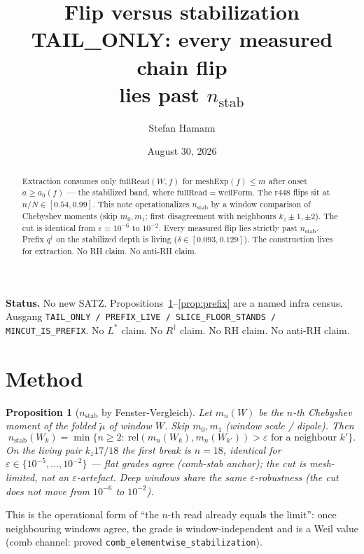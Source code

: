 \documentclass[11pt]{article}
\title{\bfseries Flip versus stabilization\\[2mm]
\large TAIL\_ONLY: every measured chain flip\\
lies past $n_{\mathrm{stab}}$}
\author{Stefan Hamann}
\date{August 30, 2026}
\newtheorem{prop}{Proposition}
\begin{document}
\maketitle

\begin{abstract}\noindent
Extraction consumes only
$\mathrm{fullRead}(W,f)$ for
$\mathrm{meshExp}(f)\le m$ after onset
$a\ge a_0(f)$ --- the stabilized band, where
$\mathrm{fullRead}=\mathrm{weilForm}$.
The r448 flips sit at $n/N\in[0.54,0.99]$.
This note operationalizes $n_{\mathrm{stab}}$
by a window comparison of Chebyshev moments
(skip $m_0,m_1$; first disagreement with
neighbours $k_z{\pm}1,{\pm}2$).
The cut is identical from $\varepsilon=10^{-6}$
to $10^{-2}$.
Every measured flip lies strictly past
$n_{\mathrm{stab}}$.
Prefix $q^{\dagger}$ on the stabilized depth
is living ($\delta\in[0.093,0.129]$).
The construction lives for extraction.
No RH claim.  No anti-RH claim.
\end{abstract}

\medskip\noindent
\textbf{Status.}\enspace
No new SATZ.
Propositions~\ref{prop:method}--\ref{prop:prefix}
are a named infra census.
Ausgang
\texttt{TAIL\_ONLY / PREFIX\_LIVE / SLICE\_FLOOR\_STANDS / MINCUT\_IS\_PREFIX}.
No $L^{*}$ claim.  No $R^{\dagger}$ claim.
No RH claim.  No anti-RH claim.

\section{Method}\label{sec:method}

\begin{prop}[$n_{\mathrm{stab}}$ by Fenster-Vergleich]\label{prop:method}
Let $m_n(W)$ be the $n$-th Chebyshev moment of the
folded $\tilde\mu$ of window $W$.
Skip $m_0,m_1$ (window scale / dipole).
Then
\[
n_{\mathrm{stab}}(W_k)
=\min\bigl\{n\ge 2:
\ \mathrm{rel}(m_n(W_k),m_n(W_{k'}))>\varepsilon
\text{ for a neighbour }k'\bigr\}.
\]
On the living pair $k_z17/18$ the first break is
$n=18$, identical for
$\varepsilon\in\{10^{-5},\ldots,10^{-2}\}$
--- flat grades agree (comb-stab anchor);
the cut is mesh-limited, not an $\varepsilon$-artefact.
Deep windows share the same $\varepsilon$-robustness
(the cut does not move from $10^{-6}$ to $10^{-2}$).
\end{prop}

This is the operational form of
``the $n$-th read already equals the limit'':
once neighbouring windows agree, the grade is
window-independent and is a Weil value
(comb channel: proved
\texttt{comb\_elementwise\_stabilization}).
\end{document}
